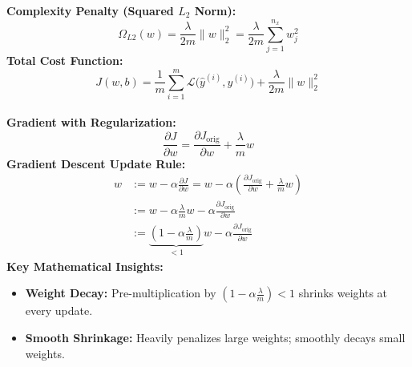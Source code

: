 \documentclass[10pt,a4paper]{article}
\begin{document}
\noindent\begin{minipage}[t]{0.485\textwidth}
\begin{tcolorbox}[
    colframe=themeblue, colback=lightbg, coltitle=white,
    fonttitle=\bfseries\sffamily\small,
    title={$L_2$ Regularization (Ridge / Weight Decay)},
    arc=1.3mm, boxrule=0.5pt, left=4pt, right=4pt, top=2pt, bottom=2pt
]
\footnotesize
\textbf{Complexity Penalty (Squared $L_2$ Norm):}
\[
\Omega_{L2}(w) = \frac{\lambda}{2m} \|w\|_2^2 = \frac{\lambda}{2m} \sum_{j=1}^{n_x} w_j^2
\]
\textbf{Total Cost Function:}
\[
J(w, b) = \frac{1}{m}\sum_{i=1}^m \mathcal{L}\big(\hat{y}^{(i)}, y^{(i)}\big) + \frac{\lambda}{2m} \|w\|_2^2
\]
\hrulefill\\[1pt]
\textbf{Gradient with Regularization:}
\[
\frac{\partial J}{\partial w} = \frac{\partial J_{\text{orig}}}{\partial w} + \frac{\lambda}{m} w
\]
\textbf{Gradient Descent Update Rule:}
\begin{align*}
w &:= w - \alpha \frac{\partial J}{\partial w} = w - \alpha \left(\frac{\partial J_{\text{orig}}}{\partial w} + \frac{\lambda}{m} w\right) \\[1pt]
&:= w - \alpha \frac{\lambda}{m} w - \alpha \frac{\partial J_{\text{orig}}}{\partial w} \\[2pt]
&:= \underbrace{\left(1 - \alpha \frac{\lambda}{m}\right)}_{< 1} w - \alpha \frac{\partial J_{\text{orig}}}{\partial w}
\end{align*}
\textbf{Key Mathematical Insights:}
\begin{itemize}[leftmargin=7pt, itemsep=0.5pt]
    \item \textbf{Weight Decay:} Pre-multiplication by $\left(1 - \alpha \frac{\lambda}{m}\right) < 1$ shrinks weights at every update.
    \item \textbf{Smooth Shrinkage:} Heavily penalizes large weights; smoothly decays small weights.
\end{itemize}
\end{tcolorbox}
\end{minipage}
\hfill
\end{document}
